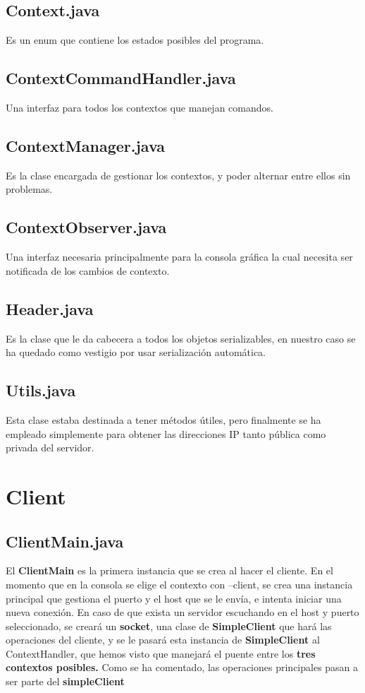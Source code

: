 \documentclass[a4paper, 12pt]{report}
\begin{document}
\section{Context.java}
Es un enum que contiene los estados posibles del programa.
\section{ContextCommandHandler.java}
Una interfaz para todos los contextos que manejan comandos.
\section{ContextManager.java}
Es la clase encargada de gestionar los contextos, y poder alternar entre ellos sin problemas.
\section{ContextObserver.java}
Una interfaz necesaria principalmente para la consola gráfica la cual necesita ser notificada de los cambios de contexto.
\section{Header.java}
Es la clase que le da cabecera a todos los objetos serializables, en nuestro caso se ha quedado como vestigio por usar serialización automática.
\section{Utils.java}
Esta clase estaba destinada a tener métodos útiles, pero finalmente se ha empleado simplemente para obtener las direcciones IP tanto pública como privada del servidor.	

\chapter{Client}
\section{ClientMain.java}

El \textbf{ClientMain} es la primera instancia que se crea al hacer el cliente. En el momento que en la consola se elige el contexto con --client, se crea una instancia principal que gestiona el puerto y el host que se le envía, e intenta iniciar una nueva conexión. En caso de que exista un servidor escuchando en el host y puerto seleccionado, se creará un \textbf{socket}, una clase de \textbf{SimpleClient} que hará las operaciones del cliente, y se le pasará esta instancia de \textbf{SimpleClient} al ContextHandler, que hemos visto que manejará el puente entre los \textbf{tres contextos posibles.}
Como se ha comentado, las operaciones principales pasan a ser parte del \textbf{simpleClient}
\end{document}
